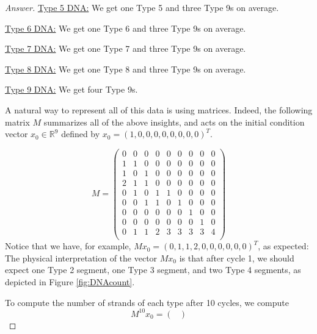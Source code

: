 \documentclass[../psets.tex]{subfiles}
\begin{document}
\begin{enumerate}
\begin{enumerate}
\begin{proof}[Answer]
            \underline{Type 5 DNA:} We get one Type 5 and three Type 9s on average.\par
            \underline{Type 6 DNA:} We get one Type 6 and three Type 9s on average.\par
            \underline{Type 7 DNA:} We get one Type 7 and three Type 9s on average.\par
            \underline{Type 8 DNA:} We get one Type 8 and three Type 9s on average.\par
            \underline{Type 9 DNA:} We get four Type 9s.\par\smallskip
            A natural way to represent all of this data is using matrices. Indeed, the following matrix $M$ summarizes all of the above insights, and acts on the initial condition vector $x_0\in\mathbb{R}^9$ defined by $x_0=(1,0,0,0,0,0,0,0,0)^T$.\par
            \begin{equation*}
                M =
                \begin{pmatrix}
                    0 & 0 & 0 & 0 & 0 & 0 & 0 & 0 & 0\\
                    1 & 1 & 0 & 0 & 0 & 0 & 0 & 0 & 0\\
                    1 & 0 & 1 & 0 & 0 & 0 & 0 & 0 & 0\\
                    2 & 1 & 1 & 0 & 0 & 0 & 0 & 0 & 0\\
                    0 & 1 & 0 & 1 & 1 & 0 & 0 & 0 & 0\\
                    0 & 0 & 1 & 1 & 0 & 1 & 0 & 0 & 0\\
                    0 & 0 & 0 & 0 & 0 & 0 & 1 & 0 & 0\\
                    0 & 0 & 0 & 0 & 0 & 0 & 0 & 1 & 0\\
                    0 & 1 & 1 & 2 & 3 & 3 & 3 & 3 & 4\\
                \end{pmatrix}
            \end{equation*}
            Notice that we have, for example, $Mx_0=(0,1,1,2,0,0,0,0,0,0)^T$, as expected: The physical interpretation of the vector $Mx_0$ is that after cycle 1, we should expect one Type 2 segment, one Type 3 segment, and two Type 4 segments, as depicted in Figure \ref{fig:DNAcount}.\par
            To compute the number of strands of each type after 10 cycles, we compute
            \begin{equation*}
                M^{10}x_0 =
                \begin{pmatrix}

\end{pmatrix}
\end{equation*}
\end{proof}
\end{enumerate}
\end{enumerate}
\end{document}
